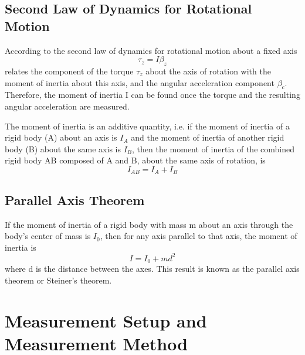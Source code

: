 \documentclass[12pt]{article}
\begin{document}
\subsection{Second Law of Dynamics for Rotational Motion}
According to the second law of dynamics for rotational motion about a fixed axis 
\begin{equation}
\tau_z =I\beta_z    
\end{equation} 
\noindent relates the component of the torque $\tau_z$ about the axis of rotation with the moment of inertia about this axis, and the angular acceleration component $\beta_c$. Therefore, the moment of inertia I can be found once the torque and the resulting angular acceleration are measured.
\par The moment of inertia is an additive quantity, i.e. if the moment of inertia of a rigid
body (A) about an axis is $I_A$ and the moment of inertia of another rigid body (B) about the same axis is $I_B$, then the moment of inertia of the combined rigid body AB composed of A and B, about the same axis of rotation, is 
\begin{equation}
I_{AB}=I_A+I_B
\end{equation}	
\subsection{Parallel Axis Theorem}
If the moment of inertia of a rigid body with mass m about an axis through the body's
center of mass is $I_0$, then for any axis parallel to that axis, the moment of inertia is
\begin{equation}
I=I_0+md^2 
\end{equation} 
where d is the distance between the axes. This result is known as the parallel axis theorem
or Steiner's theorem.
\section{Measurement Setup and Measurement Method}
\end{document}
